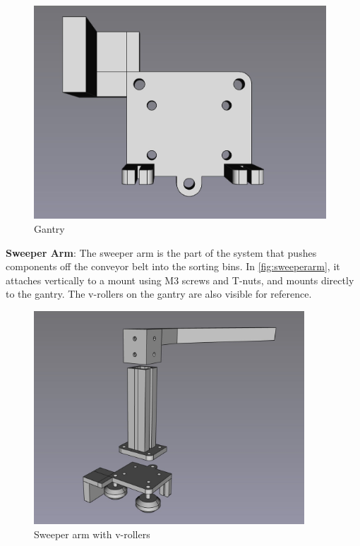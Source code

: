 \begin{figure}[H]
    \begin{minipage}[h]{0.95\textwidth}
        \centering
        \includegraphics[height=8cm]{imgs/freecad/gantry.jpg}
        \caption{Gantry}
        \label{fig:gantry}
    \end{minipage}
\end{figure}

\textbf{Sweeper Arm}: The sweeper arm is the part of the system that pushes components off the conveyor belt into the sorting bins. In \autoref{fig:sweeperarm}, it attaches vertically to a mount using M3 screws and T-nuts, and mounts directly to the gantry. The v-rollers on the gantry are also visible for reference.

\begin{figure}[H]
    \begin{minipage}[h]{0.95\textwidth}
        \centering
        \includegraphics[height=8cm]{imgs/freecad/sweeperarm.jpg}
        \caption{Sweeper arm with v-rollers}
        \label{fig:sweeperarm}
    \end{minipage}
\end{figure}

